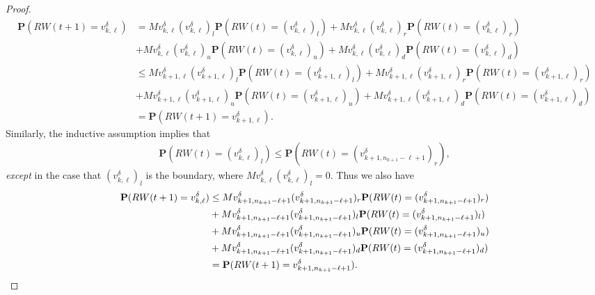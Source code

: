 \documentclass[11pt,reqno]{amsart}
\numberwithin{equation}{section}
\begin{document}
\begin{proof}
\begin{align}
\mathbf{P}(RW(t+1) = v^{\delta}_{k,\ell}) &= Mv^{\delta}_{k,\ell}(v^{\delta}_{k,\ell})_l \mathbf{P}(RW(t) = (v^{\delta}_{k,\ell})_l)
+ Mv^{\delta}_{k,\ell}(v^{\delta}_{k,\ell})_r \mathbf{P}(RW(t) = (v^{\delta}_{k,\ell})_r)\\
& + Mv^{\delta}_{k,\ell}(v^{\delta}_{k,\ell})_u \mathbf{P}(RW(t) = (v^{\delta}_{k,\ell})_u)
+ Mv^{\delta}_{k,\ell}(v^{\delta}_{k,\ell})_d \mathbf{P}(RW(t) = (v^{\delta}_{k,\ell})_d)\\
&\le Mv^{\delta}_{k+1,\ell}(v^{\delta}_{k+1,\ell})_l \mathbf{P}(RW(t) = (v^{\delta}_{k+1,\ell})_l)
+ Mv^{\delta}_{k+1,\ell}(v^{\delta}_{k+1,\ell})_r \mathbf{P}(RW(t) = (v^{\delta}_{k+1,\ell})_r)\\
& + Mv^{\delta}_{k+1,\ell}(v^{\delta}_{k+1,\ell})_u \mathbf{P}(RW(t) = (v^{\delta}_{k+1,\ell})_u)
+ Mv^{\delta}_{k+1,\ell}(v^{\delta}_{k+1,\ell})_d \mathbf{P}(RW(t) = (v^{\delta}_{k+1,\ell})_d)\\
&= \mathbf{P}(RW(t+1) = v^{\delta}_{k+1,\ell}).
\end{align}
Similarly, the inductive assumption implies that
\begin{align}
\mathbf{P}(RW(t) = (v^{\delta}_{k,\ell})_l) \le \mathbf{P}(RW(t) = (v^{\delta}_{k+1,n_{k+1}-\ell+1})_r),
\end{align}
\textit{except} in the case that $(v^{\delta}_{k,\ell})_l$ is the boundary, where $Mv^{\delta}_{k,\ell}(v^{\delta}_{k,\ell})_l = 0$.
Thus we also have
\begin{align}
\mathbf{P}(RW(t+1) = v^{\delta}_{k,\ell})
&\le Mv^{\delta}_{k+1,n_{k+1}-\ell+1}(v^{\delta}_{k+1,n_{k+1}-\ell+1})_r \mathbf{P}(RW(t) = (v^{\delta}_{k+1,n_{k+1}-\ell+1})_r) \\
&+ Mv^{\delta}_{k+1,n_{k+1}-\ell+1}(v^{\delta}_{k+1,n_{k+1}-\ell+1})_l \mathbf{P}(RW(t) = (v^{\delta}_{k+1,n_{k+1}-\ell+1})_l) \\
& + Mv^{\delta}_{k+1,n_{k+1}-\ell+1}(v^{\delta}_{k+1,n_{k+1}-\ell+1})_u \mathbf{P}(RW(t) = (v^{\delta}_{k+1,n_{k+1}-\ell+1})_u) \\
&+ Mv^{\delta}_{k+1,n_{k+1}-\ell+1}(v^{\delta}_{k+1,n_{k+1}-\ell+1})_d \mathbf{P}(RW(t) = (v^{\delta}_{k+1,n_{k+1}-\ell+1})_d)\\
&= \mathbf{P}(RW(t+1) = v^{\delta}_{k+1,n_{k+1}-\ell+1}). \qedhere
\end{align}
\end{proof}
\end{document}
